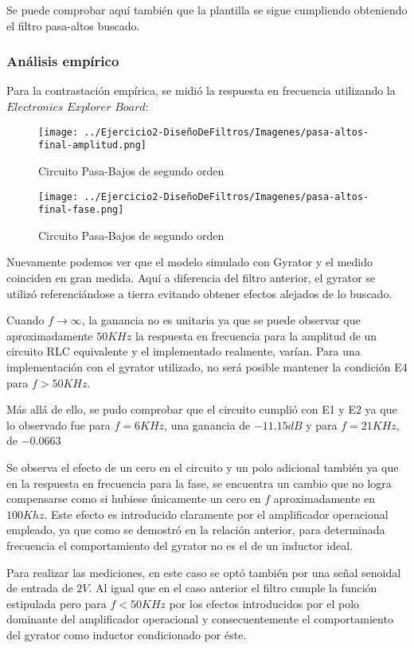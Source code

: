 Se puede comprobar aquí también que la plantilla se sigue cumpliendo obteniendo el filtro pasa-altos buscado.

\subsubsection{Análisis empírico}

Para la contrastación empírica, se midió la respuesta en frecuencia utilizando la $Electronics$ $Explorer$ $Board$:

\begin{figure}[H]
    \centering
    \texttt{[image: ../Ejercicio2-DiseñoDeFiltros/Imagenes/pasa-altos-final-amplitud.png]}
    \caption{Circuito Pasa-Bajos de segundo orden}
\end{figure}

\begin{figure}[H]
    \centering
    \texttt{[image: ../Ejercicio2-DiseñoDeFiltros/Imagenes/pasa-altos-final-fase.png]}
    \caption{Circuito Pasa-Bajos de segundo orden}
\end{figure}

Nuevamente podemos ver que el modelo simulado con Gyrator y el medido coinciden en gran medida. Aquí a diferencia del filtro anterior,
el gyrator se utilizó referenciándose a tierra evitando obtener efectos alejados de lo buscado.


Cuando $f \to \infty$, la ganancia no es unitaria ya que se puede observar que aproximadamente
$50 KHz$ la respuesta en frecuencia para la amplitud de un circuito RLC equivalente y el implementado realmente, varían.
Para una implementación con el gyrator utilizado, no será posible mantener la condición E4 para $f>50KHz$.

Más allá de ello, se pudo comprobar que el circuito cumplió con E1 y E2 ya que lo observado fue para $f=6KHz$, una ganancia
de $-11.15 dB$ y para $f=21 KHz$, de $-0.0663$

Se observa el efecto de un cero en el circuito y un polo adicional también ya que en la respuesta en frecuencia para la fase,
se encuentra un cambio que no logra compensarse como si hubiese únicamente un cero en $f$ aproximadamente en $100 Khz$.
Este efecto es introducido claramente por el amplificador operacional empleado, ya que como se demostró en la relación anterior,
para determinada frecuencia el comportamiento del gyrator no es el de un inductor ideal.

Para realizar las mediciones, en este caso se optó también por una señal senoidal de entrada de $2V$. Al igual que en el caso anterior
el filtro cumple la función estipulada pero para $f < 50 KHz$ por los efectos introducidos por el polo dominante del amplificador operacional
y consecuentemente el comportamiento del gyrator como inductor condicionado por éste.


